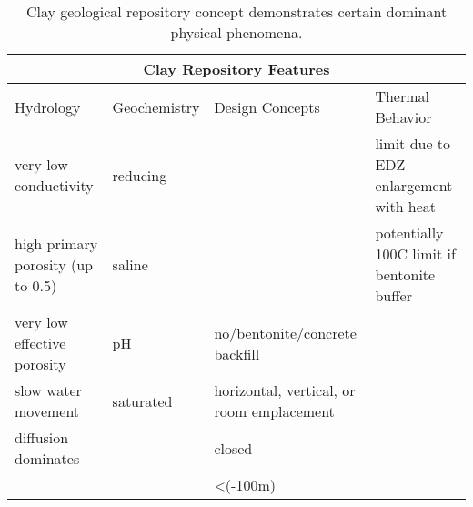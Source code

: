 %
\begin{table}[h!]
  \centering
  \footnotesize{
  \begin{tabular}{|l|l|l|l|}
    \multicolumn{4}{c}{\textbf{Clay Repository Features}}\\
    \hline
     Hydrology & Geochemistry & Design Concepts & Thermal Behavior \\ 
    \hline
    very low conductivity&reducing&&limit due to EDZ enlargement with heat\\
    high primary porosity (up to 0.5)&saline&&potentially 100C limit if bentonite buffer\\
    very low effective porosity&pH&no/bentonite/concrete backfill&\\
    slow water movement&saturated&horizontal, vertical, or room emplacement&\\
    diffusion dominates&&closed&\\
    &&<(-100m)&\\
    \hline
  \end{tabular}
  \caption[Clay Repository Features]{Clay geological repository 
  concept demonstrates certain dominant physical phenomena. }
  \label{tab:clay_tab}
  }
\end{table}


